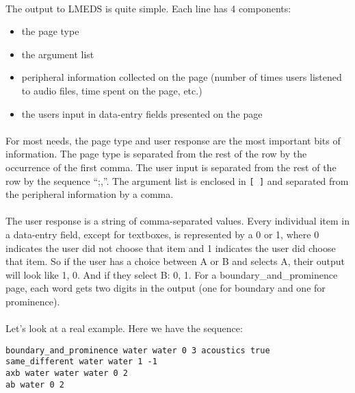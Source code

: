 \paragraph{}
The output to LMEDS is quite simple.  Each line has 4 components:
\begin{itemize}
\item	the page type
\item	the argument list
\item	peripheral information collected on the page (number of times users listened to audio files, time spent on the page, etc.)
\item	the users input in data-entry fields presented on the page
\end{itemize}

\paragraph{}
For most needs, the page type and user response are the most important bits of information.  The page type is separated from the rest of the row by the occurrence of the first comma.  The user input is separated from the rest of the row by the sequence ``;,''.  The argument list is enclosed in \texttt{[ ]} and separated from the peripheral information by a comma.  

\paragraph{}
The user response is a string of comma-separated values.  Every individual item in a data-entry field, except for textboxes, is represented by a 0 or 1, where 0 indicates the user did not choose that item and 1 indicates the user did choose that item.  So if the user has a choice between A or B and selects A, their output will look like 1, 0.  And if they select B: 0, 1.  For a boundary\_and\_prominence page, each word gets two digits in the output (one for boundary and one for prominence).

\paragraph{}
Let's look at a real example.  Here we have the sequence:

\begin{lstlisting}
boundary_and_prominence water water 0 3 acoustics true
same_different water water 1 -1
axb water water water 0 2
ab water 0 2
\end{lstlisting}

